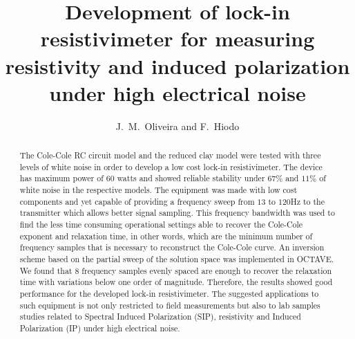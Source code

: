 \documentclass{vie16}
\begin{document}
\title{Development of lock-in resistivimeter for measuring
resistivity and induced polarization under high electrical noise}
\author{J.~M.~Oliveira and F.~Hiodo}
\maketitle


\begin{abstract}

	The Cole-Cole RC circuit model and the reduced clay model were
	tested with three levels of white noise in order to develop a low
	cost lock-in resistivimeter. The device has maximum power of 60
	watts and showed reliable stability under $67 \%$ and $11 \%$ of
	white noise in the respective models. The equipment was made with
	low cost components and yet capable of providing a frequency sweep
	from $13$ to $120$Hz to the transmitter which allows better signal
	sampling. This frequency bandwidth was used to find the less time
	consuming operational settings able to recover the Cole-Cole
	exponent and relaxation time, in other words, which are the minimum
	number of frequency samples that is necessary to reconstruct the
	Cole-Cole curve. An inversion scheme based on the partial sweep of
	the solution space was implemented in OCTAVE. We found that $8$
	frequency samples evenly spaced are enough to recover the relaxation
	time with variations below one order of magnitude. Therefore, the
	results showed good performance for the developed lock-in
	resistivimeter. The suggested applications to such equipment is not
	only restricted to field measurements but also to lab samples
	studies related to Spectral Induced Polarization (SIP), resistivity
	and Induced Polarization (IP) under high electrical noise.  
\end{abstract}	
		

\newpage
\end{document}
